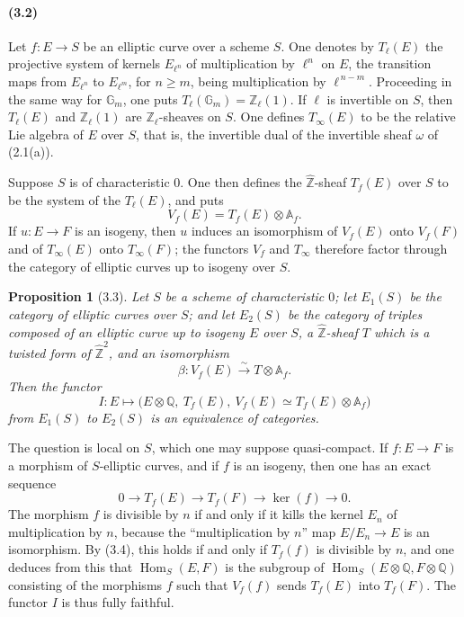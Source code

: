 \documentclass[10pt]{article}
\newcommand{\Af}{\mathbb A_f}
\newcommand{\Q}{\mathbb Q}
\newcommand{\Z}{\mathbb Z}
\newcommand{\bZ}{\widehat{\mathbb Z}}
\newcommand{\Gm}{\mathbb G_m}
\newcommand{\Hom}{\operatorname{Hom}}
\newtheorem*{proposition}{Proposition}
\begin{document}
\paragraph{(3.2)}
Let $f:E\to S$ be an elliptic curve over a scheme $S$. One denotes by $T_\ell(E)$ the
projective system of kernels $E_{\ell^n}$ of multiplication by $\ell^n$ on $E$, the transition
maps from $E_{\ell^n}$ to $E_{\ell^m}$, for $n\ge m$, being multiplication by $\ell^{\,n-m}$.
Proceeding in the same way for $\Gm$, one puts $T_\ell(\Gm)=\Z_\ell(1)$. If $\ell$ is
invertible on $S$, then $T_\ell(E)$ and $\Z_\ell(1)$ are $\Z_\ell$-sheaves on $S$. One
defines $T_\infty(E)$ to be the relative Lie algebra of $E$ over $S$, that is, the invertible
dual of the invertible sheaf $\omega$ of (2.1(a)).

Suppose $S$ is of characteristic $0$. One then defines the $\bZ$-sheaf $T_f(E)$ over $S$
to be the system of the $T_\ell(E)$, and puts
\[
V_f(E)=T_f(E)\otimes \Af.
\]
If $u:E\to F$ is an isogeny, then $u$ induces an isomorphism of $V_f(E)$ onto $V_f(F)$
and of $T_\infty(E)$ onto $T_\infty(F)$; the functors $V_f$ and $T_\infty$ therefore
factor through the category of elliptic curves up to isogeny over $S$.

\begin{proposition}[3.3]
Let $S$ be a scheme of characteristic $0$; let $E_1(S)$ be the category of elliptic curves
over $S$; and let $E_2(S)$ be the category of triples composed of an elliptic curve up to
isogeny $E$ over $S$, a $\bZ$-sheaf $T$ which is a twisted form of $\bZ^2$, and an
isomorphism
\[
\beta:V_f(E)\xrightarrow{\sim}T\otimes\Af.
\]
Then the functor
\[
I:E\longmapsto \bigl(E\otimes\Q,\ T_f(E),\ V_f(E)\simeq T_f(E)\otimes\Af\bigr)
\]
from $E_1(S)$ to $E_2(S)$ is an equivalence of categories.
\end{proposition}

The question is local on $S$, which one may suppose quasi-compact. If $f:E\to F$ is a
morphism of $S$-elliptic curves, and if $f$ is an isogeny, then one has an exact sequence
\[
0\to T_f(E)\to T_f(F)\to \ker(f)\to 0.
\tag{3.4}
\]
The morphism $f$ is divisible by $n$ if and only if it kills the kernel $E_n$ of multiplication
by $n$, because the ``multiplication by $n$'' map $E/E_n\to E$ is an isomorphism. By (3.4),
this holds if and only if $T_f(f)$ is divisible by $n$, and one deduces from this that
$\Hom_S(E,F)$ is the subgroup of $\Hom_S(E\otimes\Q,F\otimes\Q)$ consisting of the
morphisms $f$ such that $V_f(f)$ sends $T_f(E)$ into $T_f(F)$. The functor $I$ is thus
fully faithful.
\end{document}
